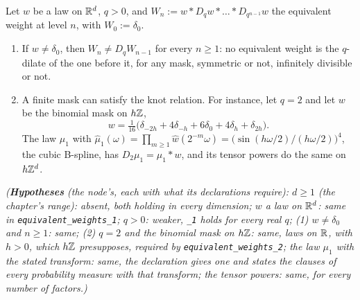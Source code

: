 \begin{proposition}
\label{prop:equivalent-weights}
\leanok
Let $w$ be a law on $\mathbb{R}^d$, $q > 0$, and $W_n := w * D_qw * \dots * D_{q^{n-1}}w$ the equivalent
weight at level $n$, with $W_0 := \delta_0$.
\begin{enumerate}
\item If $w \ne \delta_0$, then $W_n \ne D_qW_{n-1}$ for every $n \ge 1$: no equivalent weight is the
$q$-dilate of the one before it, for any mask, symmetric or not, infinitely divisible or not.
\item A finite mask can satisfy the knot relation. For instance, let $q = 2$ and let $w$ be the
binomial mask on $h\mathbb{Z}$,
\[
  w = \tfrac1{16}\bigl(\delta_{-2h} + 4\delta_{-h} + 6\delta_0 + 4\delta_h + \delta_{2h}\bigr).
\]
The law $\mu_1$ with
$\widehat\mu_1(\omega) = \prod_{m \ge 1}\widehat w(2^{-m}\omega) = \bigl(\sin(h\omega/2)/(h\omega/2)\bigr)^4$,
the cubic B-spline, has $D_2\mu_1 = \mu_1 * w$, and its tensor powers do the same on $h\mathbb{Z}^d$.
\end{enumerate}
\statusT\quad\emph{(\textbf{Hypotheses} (the node's, each with what its declarations require): $d \ge 1$
(the chapter's range): absent, both holding in every dimension; $w$ a law on $\mathbb{R}^d$: same in
\texttt{equivalent\_weights\_1}; $q > 0$: weaker, \texttt{\_1} holds for every real $q$; (1)
$w \ne \delta_0$ and $n \ge 1$: same; (2) $q = 2$ and the binomial mask on $h\mathbb{Z}$: same, laws on
$\mathbb{R}$, with $h > 0$, which $h\mathbb{Z}$ presupposes, required by \texttt{equivalent\_weights\_2}; the law
$\mu_1$ with the stated transform: same, the declaration gives one and states the clauses of every
probability measure with that transform; the tensor powers: same, for every number of factors.)}
\end{proposition}


